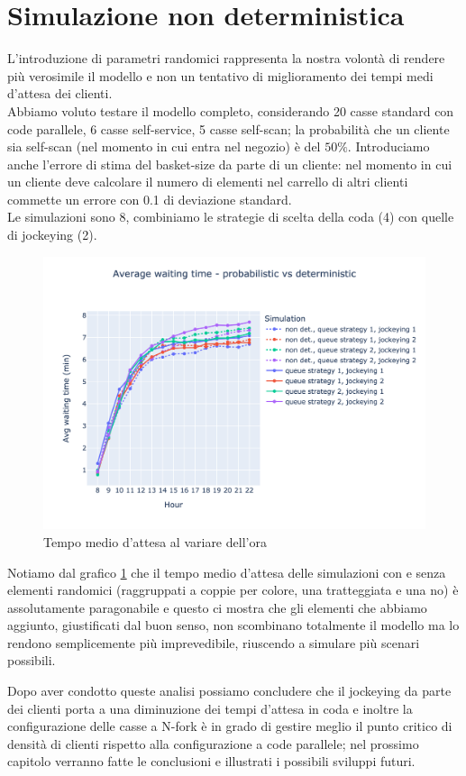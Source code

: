 \section{Simulazione non deterministica}

L'introduzione di parametri randomici rappresenta la nostra volontà di rendere più verosimile il modello e non un tentativo di miglioramento dei tempi medi d'attesa dei clienti. \\
Abbiamo voluto testare il modello completo, considerando 20 casse standard con code parallele, 6 casse self-service, 5 casse self-scan; la probabilità che un cliente sia self-scan (nel momento in cui entra nel negozio) è del $50\%$. Introduciamo anche l'errore di stima del basket-size da parte di un cliente: nel momento in cui un cliente deve calcolare il numero di elementi nel carrello di altri clienti commette un errore con 0.1 di deviazione standard. \\
Le simulazioni sono 8, combiniamo le strategie di scelta della coda
(4) con quelle di jockeying (2).

\begin{figure}[H]
	\centering
	\includegraphics[width=12cm]{"images/results/avg_wt_prob.png"}

	\caption{Tempo medio d'attesa al variare dell'ora}
	\label{fig:avg_wt_prob}
\end{figure}

Notiamo dal grafico \ref{fig:avg_wt_prob} che il tempo medio d'attesa delle simulazioni con e senza elementi randomici (raggruppati a coppie per colore, una tratteggiata e una no) è assolutamente paragonabile e questo ci mostra che gli elementi che abbiamo aggiunto, giustificati dal buon senso, non scombinano totalmente il modello ma lo rendono semplicemente più imprevedibile, riuscendo a simulare più scenari possibili.

\vspace*{1\baselineskip}

Dopo aver condotto queste analisi possiamo concludere che il jockeying
da parte dei clienti porta a una diminuzione dei tempi d'attesa in
coda e inoltre la configurazione delle casse a N-fork è in grado di
gestire meglio il punto critico di densità di clienti rispetto alla
configurazione a code parallele; nel prossimo capitolo verranno fatte
le conclusioni e illustrati i possibili sviluppi futuri.
